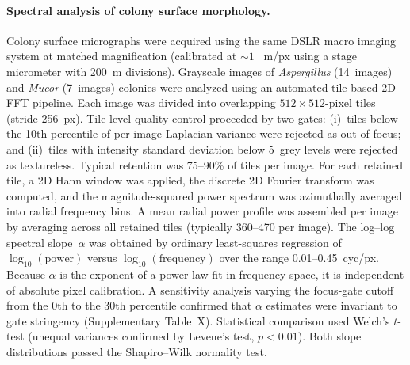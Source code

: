 \paragraph{Spectral analysis of colony surface morphology.}
Colony surface micrographs were acquired using the same DSLR macro
imaging system at matched magnification (calibrated at ${\sim}1$~\textmu
m/px using a stage micrometer with 200~\textmu m divisions).
Grayscale images of \textit{Aspergillus} (14~images) and
\textit{Mucor} (7~images) colonies were analyzed using an automated
tile-based 2D FFT pipeline.  Each image was divided into overlapping
$512 \times 512$-pixel tiles (stride 256~px).  Tile-level quality
control proceeded by two gates: (i)~tiles below the 10th percentile
of per-image Laplacian variance were rejected as out-of-focus; and
(ii)~tiles with intensity standard deviation below 5~grey levels were
rejected as textureless.  Typical retention was 75--90\% of tiles per
image.  For each retained tile, a 2D Hann window was applied, the
discrete 2D Fourier transform was computed, and the magnitude-squared
power spectrum was azimuthally averaged into radial frequency bins.  A
mean radial power profile was assembled per image by averaging across
all retained tiles (typically 360--470 per image).  The log--log
spectral slope~$\alpha$ was obtained by ordinary least-squares
regression of $\log_{10}(\mathrm{power})$ versus
$\log_{10}(\mathrm{frequency})$ over the range 0.01--0.45~cyc/px.
Because $\alpha$ is the exponent of a power-law fit in frequency
space, it is independent of absolute pixel calibration.  A sensitivity
analysis varying the focus-gate cutoff from the 0th to the 30th
percentile confirmed that $\alpha$ estimates were invariant to gate
stringency (Supplementary Table~X).  Statistical comparison used
Welch's $t$-test (unequal variances confirmed by Levene's test,
$p < 0.01$).  Both slope distributions passed the Shapiro--Wilk
normality test.



